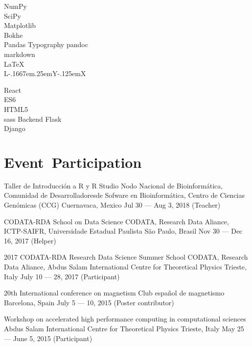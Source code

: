 \documentclass[12pt,english]{moderncv}
\makeatletter
\providecommand{\LyX}{\texorpdfstring%
  {L\kern-.1667em\lower.25em\hbox{Y}\kern-.125emX\@}
  {LyX}}
\makeatother
\begin{document}
    {NumPy\\SciPy\\Matplotlib\\Bokhe\\Pandas}
           {Typography}    {pandoc\\markdown\\\LaTeX{}\\\LyX{}}


    {React\\ES6\\HTML5\\sass}
           {Backend}       {Flask\\Django}


\section{Event~Participation}

        {Taller de Introducción a R y R Studio}
        {%
            Nodo Nacional de Bioinformática, Comunidad de Desarrolladoresde
            Sofware en Bioinformática, Centro de Ciencias Genómicas (CCG)
        }
        {Cuernavaca, Mexico}
        {Jul 30 --- Aug 3, 2018}
        {(Teacher)}

        {CODATA-RDA School on Data Science}
        {CODATA, Research Data Aliance, ICTP-SAIFR, Universidade Estadual Paulista}
        {São Paulo, Brasil}
        {Nov 30 --- Dec 16, 2017}
        {(Helper)}

        {2017 CODATA-RDA Research Data Science Summer School}
        {CODATA, Research Data Aliance, Abdus Salam International Centre for Theoretical Physics}
        {Trieste, Italy}
        {July 10 --- 28, 2017}
        {(Participant)}

        {20th International conference on magnetism}
        {Club español de magnetismo}
        {Barcelona, Spain}
        {July 5 --- 10, 2015}
        {(Poster contributor)}

        {Workshop on accelerated high performance computing in computational sciences}
        {Abdus Salam International Centre for Theoretical Physics}
        {Trieste, Italy}
        {May 25 --- June 5, 2015}
        {(Participant)}
\end{document}

